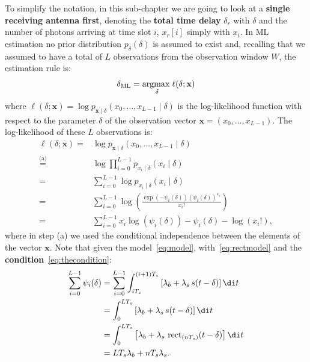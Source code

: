 \noindent
To simplify the notation, in this sub-chapter we are going to look at a \textbf{single receiving antenna first}, denoting the \textbf{total time delay} \(\delta_r\) with \(\delta\) and the number of photons arriving at time slot \(i\), \(x_r[i]\) simply with \(x_i\). In ML estimation no prior distribution \(p_{\delta}\left(\delta\right)\) is assumed to exist and, recalling that we assumed to have a total of \(L\) observations from the observation window \(W\), the estimation rule is:
\begin{equation}
\delta_{\mathrm{ML}} =\underset{\delta}{\operatorname*{argmax\;}} \ell(\delta ; \mathbf{x})
\end{equation}
where \(\ell(\delta ; \mathbf{x})=\log p_{\textbf{x} \mid \delta}\left( x_0, \ldots,x_{L-1} \mid\delta\right)\) is the log-likelihood function with respect to the parameter \(\delta\) of the observation vector \(\mathbf{x}=(x_0,\ldots,x_{L-1})\). The log-likelihood of these \(L\) observations is:
\begin{equation}
\begin{aligned}
\ell(\delta ; \mathbf{x})
= & \log p_{\textbf{x} \mid \delta}\left(x_0, \ldots,x_{L-1} \mid \delta\right)\\
\overset{\text{(a)}}{=} & \log \prod_{i=0}^{L-1} p_{x_i \mid \delta}\left(x_i \mid \delta\right)\\
= & \sum_{i=0}^{L-1} \log p_{x_i \mid \delta}\left(x_i \mid \delta\right) \\
= & \sum_{i=0}^{L-1} \log \left(\frac{\exp(-\psi_i(\delta))(\psi_i(\delta))^{x_i}}{x_{i}!} \right)\\
= & \sum_{i=0}^{L-1} x_i \log \left( \psi_i(\delta)\right) -\psi_i(\delta)-\log \left(x_{i}!\right),
\end{aligned}
\label{eq:the_true_one}
\end{equation}
where in step (a) we used the conditional independence between the elements of the vector \(\mathbf{x}\). Note that given the model~\eqref{eq:model}, with~\eqref{eq:rectmodel} and the \textbf{condition}~\eqref{eq:thecondition}:
\begin{equation}
\begin{aligned}
\sum_{i=0}^{L-1}\psi_i(\delta)
& = \sum_{i=0}^{L-1}
\int_{iT_s}^{(i+1)T_s} \left[ \lambda_{b}+\lambda_{s} \, s(t-\delta) \right] \di t\\
& = \int_{0}^{LT_s} \left[ \lambda_{b}+\lambda_{s} \, s(t-\delta) \right] \di t\\
& = \int_{0}^{LT_s} \left[ \lambda_{b}+\lambda_{s} \, \operatorname{rect}_{(nT_s)}(t-\delta) \right] \di t\\
& =LT_s\lambda_b+nT_s\lambda_s.
\end{aligned}
\end{equation}

